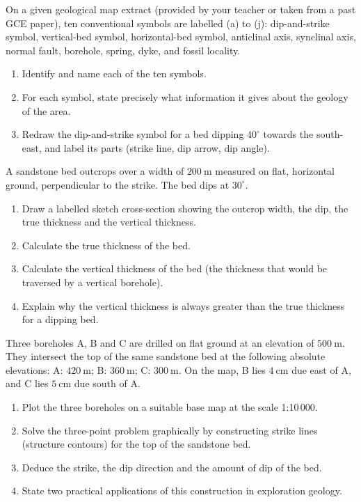\documentclass[11pt]{article}
\newcommand{\cle}[1]{{\popxbold\color{popdark}#1}}
\newcounter{popsec}
\newcounter{popsub}
\newcommand{\courssub}[1]{%
  \stepcounter{popsub}%
  \par\vspace{9pt}\noindent{\popxbold\fontsize{11.5}{13}\selectfont\color{popink}{\color{poporange}\thepopsec.\thepopsub}\hspace{6pt}#1}\par\nopagebreak\vspace{4pt}
}
\begin{document}
\courssub{I practise}

\begin{exercice}
On a given geological map extract (provided by your teacher or taken from a past GCE paper), ten conventional symbols are labelled (a) to (j): dip-and-strike symbol, vertical-bed symbol, horizontal-bed symbol, anticlinal axis, synclinal axis, normal fault, borehole, spring, dyke, and fossil locality.
\begin{enumerate}
\item Identify and name each of the ten symbols.
\item For each symbol, state precisely what information it gives about the geology of the area.
\item Redraw the dip-and-strike symbol for a bed dipping $40^{\circ}$ towards the south-east, and label its parts (strike line, dip arrow, dip angle).
\end{enumerate}
\end{exercice}

\begin{exercice}
A sandstone bed outcrops over a width of $200\ \mathrm{m}$ measured on flat, horizontal ground, perpendicular to the strike. The bed dips at $30^{\circ}$.
\begin{enumerate}
\item Draw a labelled sketch cross-section showing the outcrop width, the dip, the true thickness and the vertical thickness.
\item Calculate the \cle{true thickness} of the bed.
\item Calculate the \cle{vertical thickness} of the bed (the thickness that would be traversed by a vertical borehole).
\item Explain why the vertical thickness is always greater than the true thickness for a dipping bed.
\end{enumerate}
\end{exercice}

\begin{exercice}
Three boreholes A, B and C are drilled on flat ground at an elevation of $500\ \mathrm{m}$. They intersect the top of the same sandstone bed at the following absolute elevations: A: $420\ \mathrm{m}$; B: $360\ \mathrm{m}$; C: $300\ \mathrm{m}$. On the map, B lies $4\ \mathrm{cm}$ due east of A, and C lies $5\ \mathrm{cm}$ due south of A.
\begin{enumerate}
\item Plot the three boreholes on a suitable base map at the scale 1:10\,000.
\item Solve the three-point problem graphically by constructing strike lines (structure contours) for the top of the sandstone bed.
\item Deduce the strike, the dip direction and the amount of dip of the bed.
\item State two practical applications of this construction in exploration geology.
\end{enumerate}
\end{exercice}
\end{document}
